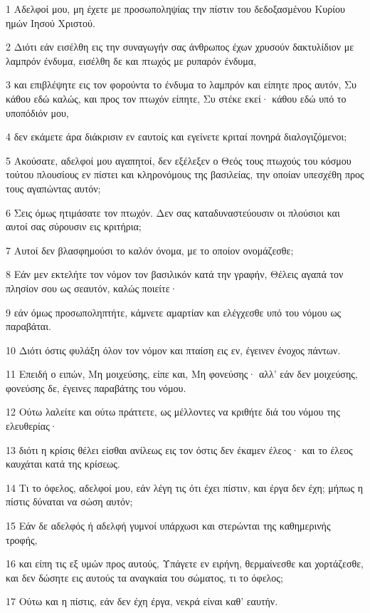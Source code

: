 \par 1 Αδελφοί μου, μη έχετε με προσωποληψίας την πίστιν του δεδοξασμένου Κυρίου ημών Ιησού Χριστού.
\par 2 Διότι εάν εισέλθη εις την συναγωγήν σας άνθρωπος έχων χρυσούν δακτυλίδιον με λαμπρόν ένδυμα, εισέλθη δε και πτωχός με ρυπαρόν ένδυμα,
\par 3 και επιβλέψητε εις τον φορούντα το ένδυμα το λαμπρόν και είπητε προς αυτόν, Συ κάθου εδώ καλώς, και προς τον πτωχόν είπητε, Συ στέκε εκεί· κάθου εδώ υπό το υποπόδιόν μου,
\par 4 δεν εκάμετε άρα διάκρισιν εν εαυτοίς και εγείνετε κριταί πονηρά διαλογιζόμενοι;
\par 5 Ακούσατε, αδελφοί μου αγαπητοί, δεν εξέλεξεν ο Θεός τους πτωχούς του κόσμου τούτου πλουσίους εν πίστει και κληρονόμους της βασιλείας, την οποίαν υπεσχέθη προς τους αγαπώντας αυτόν;
\par 6 Σεις όμως ητιμάσατε τον πτωχόν. Δεν σας καταδυναστεύουσιν οι πλούσιοι και αυτοί σας σύρουσιν εις κριτήρια;
\par 7 Αυτοί δεν βλασφημούσι το καλόν όνομα, με το οποίον ονομάζεσθε;
\par 8 Εάν μεν εκτελήτε τον νόμον τον βασιλικόν κατά την γραφήν, Θέλεις αγαπά τον πλησίον σου ως σεαυτόν, καλώς ποιείτε·
\par 9 εάν όμως προσωποληπτήτε, κάμνετε αμαρτίαν και ελέγχεσθε υπό του νόμου ως παραβάται.
\par 10 Διότι όστις φυλάξη όλον τον νόμον και πταίση εις εν, έγεινεν ένοχος πάντων.
\par 11 Επειδή ο ειπών, Μη μοιχεύσης, είπε και, Μη φονεύσης· αλλ' εάν δεν μοιχεύσης, φονεύσης δε, έγεινες παραβάτης του νόμου.
\par 12 Ούτω λαλείτε και ούτω πράττετε, ως μέλλοντες να κριθήτε διά του νόμου της ελευθερίας·
\par 13 διότι η κρίσις θέλει είσθαι ανίλεως εις τον όστις δεν έκαμεν έλεος· και το έλεος καυχάται κατά της κρίσεως.
\par 14 Τι το όφελος, αδελφοί μου, εάν λέγη τις ότι έχει πίστιν, και έργα δεν έχη; μήπως η πίστις δύναται να σώση αυτόν;
\par 15 Εάν δε αδελφός ή αδελφή γυμνοί υπάρχωσι και στερώνται της καθημερινής τροφής,
\par 16 και είπη τις εξ υμών προς αυτούς, Υπάγετε εν ειρήνη, θερμαίνεσθε και χορτάζεσθε, και δεν δώσητε εις αυτούς τα αναγκαία του σώματος, τι το όφελος;
\par 17 Ούτω και η πίστις, εάν δεν έχη έργα, νεκρά είναι καθ' εαυτήν.
